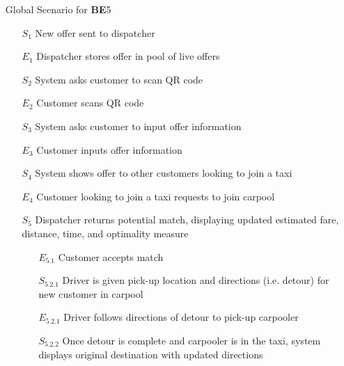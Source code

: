 \documentclass[]{article}
\begin{document}
\begin{enumerate}[{\textbf{BE}}1.]
\begin{enumerate}[{\textbf{VP5}}.1]
\begin{enumerate}
            \end{enumerate}
        \item[Global] Scenario for \textbf{BE}5
            \begin{enumerate}
                \item[$S_1$] New offer sent to dispatcher
                \item[$E_1$] Dispatcher stores offer in pool of live offers
                \item[$S_2$] System asks customer to scan QR code
                \item[$E_2$] Customer scans QR code
                \item[$S_3$] System asks customer to input offer information
                \item[$E_3$] Customer inputs offer information
                \item[$S_4$] System shows offer to other customers looking to join a taxi
                \item[$E_4$] Customer looking to join a taxi requests to join carpool
                \item[$S_5$] Dispatcher returns potential match, displaying updated estimated fare, distance, time, and optimality measure
                \begin{enumerate}
                    \item[$E_{5.1}$] Customer accepts match
                    	\item[$S_{5.2.1}$] Driver is given pick-up location and directions (i.e. detour) for new customer in carpool
                    	\item[$E_{5.2.1}$] Driver follows directions of detour to pick-up carpooler
                    	\item[$S_{5.2.2}$] Once detour is complete and carpooler is in the taxi, system displays original destination with updated directions
               

\end{enumerate}
\end{enumerate}
\end{enumerate}
\end{enumerate}
\end{document}
